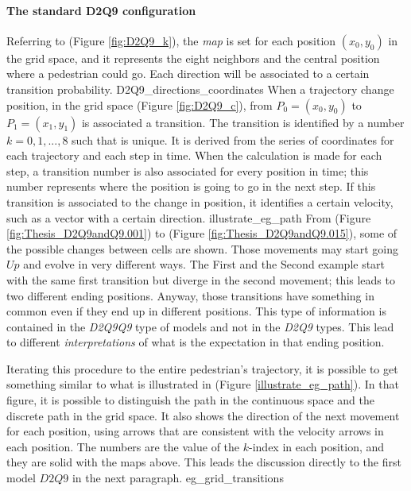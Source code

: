 \documentclass[class=article, crop=false]{standalone}
\begin{document}
\paragraph{The standard D2Q9 configuration}
Referring to (Figure \ref{fig:D2Q9_k}), the \emph{map} is set for each position $(x_0, y_0)$ in the grid space, and it represents the eight neighbors and the central position where a pedestrian could go. 
Each direction will be associated to a certain transition probability. 
	{D2Q9_directions_coordinates}
When a trajectory change position, in the grid space (Figure \ref{fig:D2Q9_c}), from $P_0=(x_0, y_0)$ to $P_1=(x_1, y_1)$ is associated a transition. 
The transition is identified by a number $k = 0,1,...,8$ such that is unique. 
It is derived from the series of coordinates for each trajectory and each step in time. 
When the calculation is made for each step, a transition number is also associated for every position in time; this number represents where the position is going to go in the next step.
If this transition is associated to the change in position, it identifies a certain velocity, such as a vector with a certain direction. 
	{illustrate_eg_path}
From (Figure \ref{fig:Thesis_D2Q9andQ9.001})  to  (Figure \ref{fig:Thesis_D2Q9andQ9.015}), some of the possible changes between cells are shown. 
Those movements may start going $Up$ and evolve in very different ways. 
The First and the Second example start with the same first transition but diverge in the second movement; this leads to two different ending positions. 
Anyway, those transitions have something in common even if they end up in different positions. 
This type of information is contained in the \emph{D2Q9Q9} type of models and not in the \emph{D2Q9} types. 
This lead to different \emph{interpretations} of what is the expectation in that ending position.

Iterating this procedure to the entire pedestrian’s trajectory, it is possible to get something similar to what is illustrated in (Figure \ref{illustrate_eg_path}). 
In that figure, it is possible to distinguish the path in the continuous space and the discrete path in the grid space. 
It also shows the direction of the next movement for each position, using arrows that are consistent with the velocity arrows in each position. 
The numbers are the value of the $k$-index in each position, and they are solid with the maps above. 
This leads the discussion directly to the first model $D2Q9$ in the next paragraph.
	{eg_grid_transitions}
\end{document}
